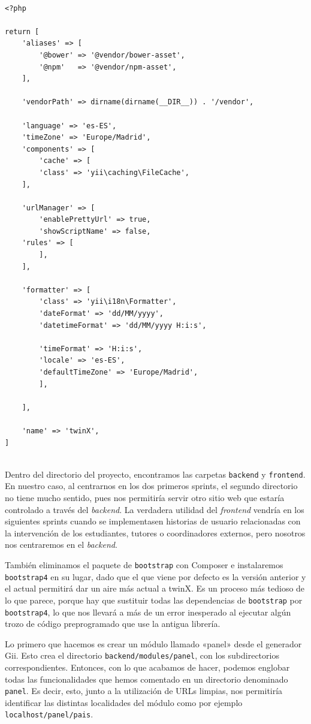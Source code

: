 \begin{verbatim}
	
<?php

return [
	'aliases' => [
		'@bower' => '@vendor/bower-asset',
		'@npm'   => '@vendor/npm-asset',
	],
	
	'vendorPath' => dirname(dirname(__DIR__)) . '/vendor',
	
	'language' => 'es-ES',
	'timeZone' => 'Europe/Madrid',
	'components' => [
		'cache' => [
		'class' => 'yii\caching\FileCache',
	],
	
	'urlManager' => [
		'enablePrettyUrl' => true,
		'showScriptName' => false,
	'rules' => [
		],
	],
	
	'formatter' => [
		'class' => 'yii\i18n\Formatter',
		'dateFormat' => 'dd/MM/yyyy',
		'datetimeFormat' => 'dd/MM/yyyy H:i:s',
		
		'timeFormat' => 'H:i:s',
		'locale' => 'es-ES',
		'defaultTimeZone' => 'Europe/Madrid',
		],
	
	],
	
	'name' => 'twinX',
]
	
\end{verbatim}

Dentro del directorio del proyecto, encontramos las carpetas \texttt{backend} y \texttt{frontend}. En nuestro caso, al centrarnos en los dos primeros sprints, el segundo directorio no tiene mucho sentido, pues nos permitiría servir otro sitio web que estaría controlado a través del \textit{backend}. La verdadera utilidad del \textit{frontend} vendría en los siguientes sprints cuando se implementasen historias de usuario relacionadas con la intervención de los estudiantes, tutores o coordinadores externos, pero nosotros nos centraremos en el \textit{backend}.

También eliminamos el paquete de \texttt{bootstrap} con Composer e instalaremos \texttt{bootstrap4} en su lugar, dado que el que viene por defecto es la versión anterior y el actual permitirá dar un aire más actual a twinX. Es un proceso más tedioso de lo que parece, porque hay que sustituir todas las dependencias de \texttt{bootstrap} por \texttt{bootstrap4}, lo que nos llevará a más de un error inesperado al ejecutar algún trozo de código preprogramado que use la antigua librería.

Lo primero que hacemos es crear un módulo llamado «panel» desde el generador Gii. Esto crea el directorio \texttt{backend/modules/panel}, con los subdirectorios correspondientes. Entonces, con lo que acabamos de hacer, podemos englobar todas las funcionalidades que hemos comentado en un directorio denominado \texttt{panel}. Es decir, esto, junto a la utilización de URLs limpias, nos permitiría identificar las distintas localidades del módulo como por ejemplo \texttt{localhost/panel/pais}.

